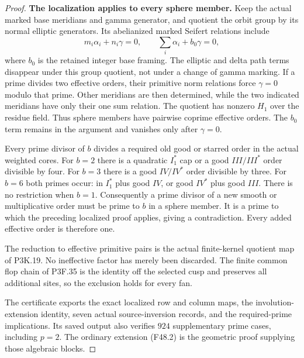 \begin{proof}
\par\medskip\noindent\textbf{The localization applies to every sphere member.}
Keep the actual marked base meridians and gamma generator,
and quotient the orbit group by its normal elliptic generators.
Its abelianized marked Seifert relations include
\[
 m_i\alpha_i+n_i\gamma=0,\qquad
                  \sum_i\alpha_i+b_0\gamma=0,                    \tag{F48.6}
\]
where $b_0$ is the retained integer base framing.
The elliptic and delta path terms disappear under this group
quotient, not under a change of gamma marking.
If a prime divides two effective orders, their primitive norm
relations force $\gamma=0$ modulo that prime. Other
meridians are then determined, while the two indicated
meridians have only their one sum relation. The quotient has
nonzero $H_1$ over the residue field. Thus sphere members have
pairwise coprime effective orders. The $b_0$ term remains in
the argument and vanishes only after $\gamma=0$.

Every prime divisor of $b$ divides a required old good or
starred order in the actual weighted cores. For $b=2$ there
is a quadratic $I_1^*$ cap or a good $III/III^*$ order
divisible by four. For $b=3$ there is a good $IV/IV^*$ order
divisible by three. For $b=6$ both primes occur: in
$I_1^*$ plus good $IV$, or good $IV^*$ plus good $III$.
There is no restriction when $b=1$.
Consequently a prime divisor of a new smooth or multiplicative
order must be prime to $b$ in a sphere member. It is a prime
to which the preceding localized proof applies, giving a
contradiction. Every added effective order is therefore one.

The reduction to effective primitive pairs is the actual
finite-kernel quotient map of P3K.19. No ineffective factor
has merely been discarded. The finite common flop chain of
P3F.35 is the identity off the selected cusp and preserves
all additional sites, so the exclusion holds for every fan.

The certificate 
exports the exact localized row and column maps, the
involution-extension identity, seven actual source-inversion
records, and the required-prime implications. Its saved
output also verifies $924$ supplementary prime cases,
including $p=2$. The ordinary extension (F48.2) is the
geometric proof supplying those algebraic blocks.
\end{proof}
